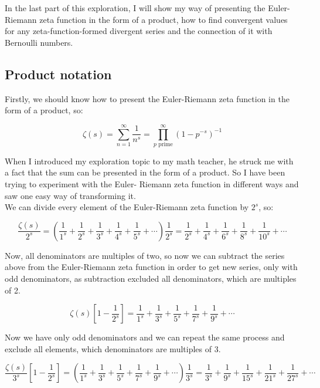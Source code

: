 \documentclass[a4paper]{article}
\begin{document}
In the last part of this exploration, I will show my way of presenting the
Euler-Riemann zeta function in the form of a product, how to find convergent
values for any zeta-function-formed divergent series and the connection of it
with Bernoulli numbers. 

\subsection{Product notation}
\label{sec:org9016fb9}

Firstly, we should know how to present the Euler-Riemann zeta function in the
form of a product, so:

\begin{equation}
  \zeta(s)=\sum_{n=1}^{\infty} \frac{1}{n^s}=\prod_{p \text{ prime}}^{\infty} (1-p^{-s})^{-1}
\end{equation}

When I introduced my exploration topic to my math teacher, he struck me with a
fact that the sum can be presented in the form of a product. So I have been
trying to experiment with the Euler- Riemann zeta function in different ways and
saw one easy way of transforming it.\\

We can divide every element of the Euler-Riemann zeta function by \(2^s\), so:

\begin{equation*}
  \frac{\zeta(s)}{2^s}= (\frac{1}{1^s}+\frac{1}{2^s}+\frac{1}{3^s}+
  \frac{1}{4^s}+\frac{1}{5^s}+\cdots)\frac{1}{2^s}=
  \frac{1}{2^s}+\frac{1}{4^s}+\frac{1}{6^s}+
  \frac{1}{8^s}+\frac{1}{10^s}+\cdots
  \end{equation*}

Now, all denominators are multiples of two, so now we can subtract the series
above from the Euler-Riemann zeta function in order to get new series, only with
odd denominators, as subtraction excluded all denominators, which are multiples
of 2. 

\begin{equation*}
  \zeta(s)[1-\frac{1}{2^s}]=\frac{1}{1^s}+\frac{1}{3^s}+\frac{1}{5^s}+
  \frac{1}{7^s}+\frac{1}{9^s}+\cdots
  \end{equation*}

Now we have only odd denominators and we can repeat the same process and exclude
all elements, which denominators are multiples of 3.

\begin{equation*}
  \frac{\zeta(s)}{3^s}[1-\frac{1}{2^s}] = (\frac{1}{1^s}+\frac{1}{3^s}+\frac{1}{5^s}+
  \frac{1}{7^s}+\frac{1}{9^s}+\cdots)\frac{1}{3^s}=\frac{1}{3^s}+\frac{1}{9^s}+\frac{1}{15^s}+
  \frac{1}{21^s}+\frac{1}{27^s}+\cdots
\end{equation*}
\end{document}
